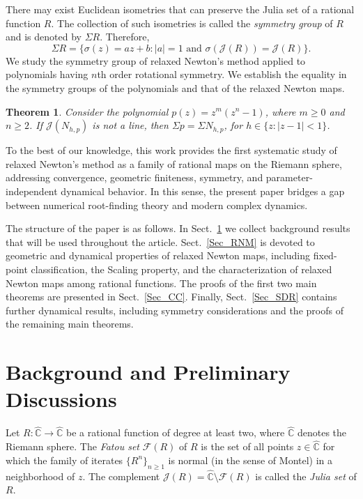 \documentclass[12pt]{article}
\newtheorem{maintheorem}{Theorem}
\numberwithin{equation}{section}
\begin{document}
There may exist Euclidean isometries that can preserve the Julia set of a rational function $R$. The collection of such isometries is called the \textit{symmetry group} of $R$ and is denoted by $\Sigma R$. Therefore,
$$\Sigma R=\{\sigma(z)=az+b: |a|=1\text{ and }\sigma(\mathcal{J}(R))=\mathcal{J}(R)\}.$$
We study the symmetry group of relaxed Newton's method applied to polynomials having $n$th order rotational symmetry. We establish the equality in the symmetry groups of the polynomials and that of the relaxed Newton maps.
\begin{maintheorem}\label{Same_sym}
Consider the polynomial $p(z)=z^m(z^n-1)$, where $m\geq 0$ and $n\geq 2$. If $\mathcal{J}(N_{h,p})$ is not a line, then $\Sigma p= \Sigma N_{h,p}$, for $h\in \{z:|z-1|<1\}$.
\end{maintheorem}
To the best of our knowledge, this work provides the first systematic study of relaxed Newton's method as a family of rational maps on the Riemann sphere, addressing convergence, geometric finiteness, symmetry, and parameter-independent dynamical behavior. In this sense, the present paper bridges a gap between numerical root-finding theory and modern complex dynamics.

The structure of the paper is as follows. In Sect.~\ref{Sec_B&P} we collect background results that will be used throughout the article. Sect.~\ref{Sec_RNM} is devoted to geometric and dynamical properties of relaxed Newton maps, including fixed-point classification, the Scaling property, and the characterization of relaxed Newton maps among rational functions. The proofs of the first two main theorems are presented in Sect.~\ref{Sec_CC}. Finally, Sect.~\ref{Sec_SDR} contains further dynamical results, including symmetry considerations and the proofs of the remaining main theorems.
\section{Background and Preliminary Discussions}\label{Sec_B&P}

Let $R:\widehat{\mathbb{C}}\to \widehat{\mathbb{C}}$ be a rational function of degree at least two, where $\widehat{\mathbb{C}}$ denotes the Riemann sphere. The \textit{Fatou set} $\mathcal{F}(R)$ of $R$ is the set of all points $z\in \widehat{\mathbb{C}}$ for which the family of iterates $\{R^n\}_{n\geq 1}$ is normal (in the sense of Montel) in a neighborhood of $z$. The complement $\mathcal{J}(R)=\widehat{\mathbb{C}}\setminus \mathcal{F}(R)$ is called the \textit{Julia set} of $R$.
\end{document}
